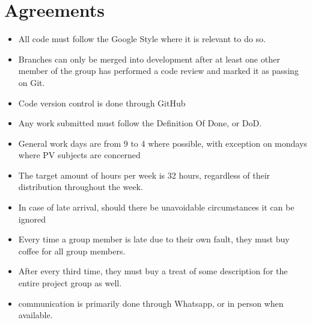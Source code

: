 \section{Agreements}
\begin{itemize}
	\item All code must follow the Google Style where it is relevant to do so.
	\item Branches can only be merged into development after at least one other member of the group has performed a code review and marked it as passing on Git.
	\item Code version control is done through GitHub
	\item Any work submitted must follow the Definition Of Done, or DoD.
\item General work days are from 9 to 4 where possible, with exception on mondays where PV subjects are concerned
\item The target amount of hours per week is 32 hours, regardless of their distribution throughout the week.
\item In case of late arrival, should there be unavoidable circumstances it can be ignored
\item Every time a group member is late due to their own fault, they must buy coffee for all group members.
\item After every third time, they must buy a treat of some description for the entire project group as well.
\item communication is primarily done through Whatsapp, or in person when available.
\end{itemize}
\newpage